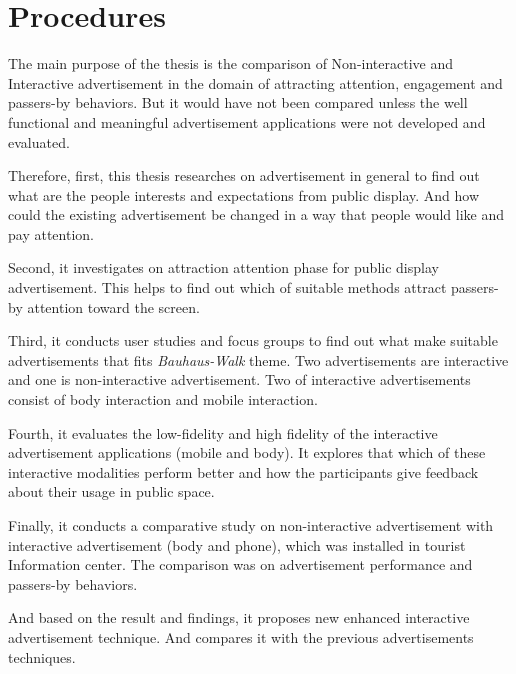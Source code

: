 \section{Procedures}

The main purpose of the thesis is the comparison of Non-interactive and Interactive advertisement in the domain of attracting attention, engagement and passers-by behaviors. But it would have not been compared unless the well functional and meaningful advertisement applications were not developed and evaluated. 

Therefore, first, this thesis researches on advertisement in general to find out what are the people interests and expectations from public display. And how could the existing advertisement be changed in a way that people would like and pay attention.

Second, it investigates on attraction attention phase for public display advertisement. This helps to find out which of suitable methods attract passers-by attention toward the screen.

Third, it conducts user studies and focus groups to find out what make suitable advertisements that fits \emph{Bauhaus-Walk} theme. Two advertisements are interactive and one is non-interactive advertisement. Two of interactive advertisements consist of body interaction and mobile interaction.

Fourth, it evaluates the low-fidelity and high fidelity of the interactive advertisement applications (mobile and body). It explores that which of these interactive modalities perform better and how the participants give feedback about their usage in public space.

Finally, it conducts a comparative study on non-interactive advertisement with interactive advertisement (body and phone), which was installed in tourist Information center.  The comparison was on advertisement performance and passers-by behaviors.

And based on the result and findings, it proposes new enhanced interactive advertisement technique. And compares it with the previous advertisements techniques.




